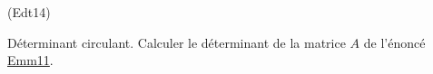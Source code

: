 \begin{tiny}(Edt14)\end{tiny} Déterminant circulant.\newline
Calculer le déterminant de la matrice $A$ de l'énoncé \href{\exosurl _fex_mm.pdf}{Emm11}.